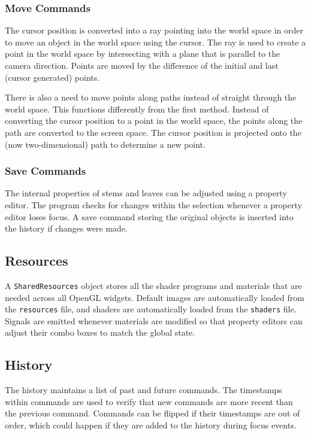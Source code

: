 \documentclass[10pt]{article}
\begin{document}
\subsubsection{Move Commands}

The cursor position is converted into a ray pointing into the world space in order to move an object in the world space using the cursor. The ray is used to create a point in the world space by intersecting with a plane that is parallel to the camera direction. Points are moved by the difference of the initial and last (cursor generated) points.

There is also a need to move points along paths instead of straight through the world space. This functions differently from the first method. Instead of converting the cursor position to a point in the world space, the points along the path are converted to the screen space. The cursor position is projected onto the (now two-dimensional) path to determine a new point.

\subsubsection{Save Commands}

The internal properties of stems and leaves can be adjusted using a property editor. The program checks for changes within the selection whenever a property editor loses focus. A save command storing the original objects is inserted into the history if changes were made.

\subsection{Resources}

A \texttt{SharedResources} object stores all the shader programs and materials that are needed across all OpenGL widgets. Default images are automatically loaded from the \texttt{resources} file, and shaders are automatically loaded from the \texttt{shaders} file. Signals are emitted whenever materials are modified so that property editors can adjust their combo boxes to match the global state.

\subsection{History}

The history maintains a list of past and future commands. The timestamps within commands are used to verify that new commands are more recent than the previous command. Commands can be flipped if their timestamps are out of order, which could happen if they are added to the history during focus events.
\end{document}
